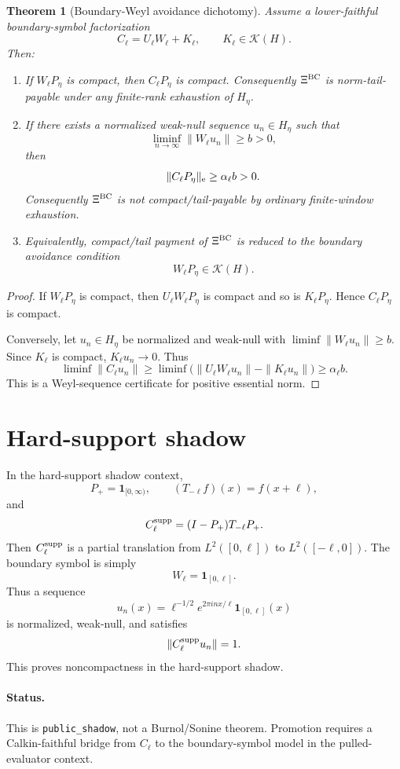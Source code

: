 \documentclass[11pt]{article}
\newtheorem{theorem}{Theorem}
\begin{document}
\begin{theorem}[Boundary-Weyl avoidance dichotomy]
Assume a lower-faithful boundary-symbol factorization
\[
  C_\ell = U_\ell W_\ell+K_\ell,
  \qquad K_\ell\in\mathcal K(H).
\]
Then:
\begin{enumerate}[label=(\roman*)]
\item If $W_\ell P_\eta$ is compact, then $C_\ell P_\eta$ is compact.  Consequently $\Xi^{\rm BC}$ is norm-tail-payable under any finite-rank exhaustion of $H_\eta$.
\item If there exists a normalized weak-null sequence $u_n\in H_\eta$ such that
\[
  \liminf_{n\to\infty}\|W_\ell u_n\|\ge b>0,
\]
then
\[
  \|C_\ell P_\eta\|_{\rm e}\ge \alpha_\ell b>0.
\]
Consequently $\Xi^{\rm BC}$ is not compact/tail-payable by ordinary finite-window exhaustion.
\item Equivalently, compact/tail payment of $\Xi^{\rm BC}$ is reduced to the boundary avoidance condition
\[
  W_\ell P_\eta\in\mathcal K(H).
\]
\end{enumerate}
\end{theorem}

\begin{proof}
If $W_\ell P_\eta$ is compact, then $U_\ell W_\ell P_\eta$ is compact and so is $K_\ell P_\eta$. Hence $C_\ell P_\eta$ is compact.

Conversely, let $u_n\in H_\eta$ be normalized and weak-null with $\liminf\|W_\ell u_n\|\ge b$. Since $K_\ell$ is compact, $K_\ell u_n\to 0$. Thus
\[
  \liminf\|C_\ell u_n\|
  \ge
  \liminf\bigl(\|U_\ell W_\ell u_n\|-\|K_\ell u_n\|\bigr)
  \ge \alpha_\ell b.
\]
This is a Weyl-sequence certificate for positive essential norm.
\end{proof}

\section{Hard-support shadow}
In the hard-support shadow context,
\[
  P_+=\mathbf 1_{[0,\infty)},
  \qquad
  (T_{-\ell}f)(x)=f(x+\ell),
\]
and
\[
  C^{\rm supp}_\ell=(I-P_+)T_{-\ell}P_+.
\]
Then $C^{\rm supp}_\ell$ is a partial translation from $L^2([0,\ell])$ to $L^2([-\ell,0])$.  The boundary symbol is simply
\[
  W_\ell=\mathbf 1_{[0,\ell]}.
\]
Thus a sequence
\[
  u_n(x)=\ell^{-1/2}e^{2\pi i n x/\ell}\mathbf 1_{[0,\ell]}(x)
\]
is normalized, weak-null, and satisfies
\[
  \|C^{\rm supp}_\ell u_n\|=1.
\]
This proves noncompactness in the hard-support shadow.

\paragraph{Status.} This is \texttt{public\_shadow}, not a Burnol/Sonine theorem.  Promotion requires a Calkin-faithful bridge from $C_\ell$ to the boundary-symbol model in the pulled-evaluator context.
\end{document}
